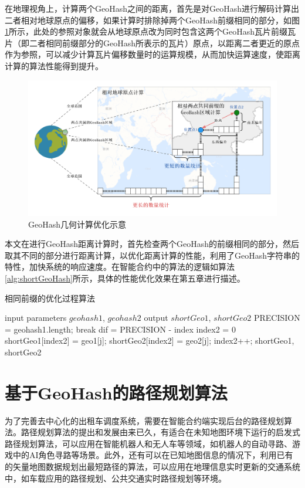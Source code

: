 在地理视角上，计算两个GeoHash之间的距离，首先是对GeoHash进行解码计算出二者相对地球原点的偏移，如果计算时排除掉两个GeoHash前缀相同的部分，如图\ref{fig:calBetter}所示，此处的参照对象就会从地球原点改为同时包含这两个GeoHash瓦片前缀瓦片（即二者相同前缀部分的GeoHash所表示的瓦片）原点，以距离二者更近的原点作为参照，可以减少计算瓦片偏移数量时的运算规模，从而加快运算速度，使距离计算的算法性能得到提升。

\begin{figure}[h]
  \centering
  \includegraphics[width=1.0\textwidth]{figures/GeoHash计算优化}
  \caption{GeoHash几何计算优化示意}\label{fig:calBetter}
\end{figure}

本文在进行GeoHash距离计算时，首先检查两个GeoHash的前缀相同的部分，然后取其不同的部分进行距离计算，以优化距离计算的性能，利用了GeoHash字符串的特性，加快系统的响应速度。在智能合约中的算法的逻辑如算法\ref{alg:shortGeoHash}所示，具体的性能优化效果在第五章进行描述。

\begin{algorithm}[h]
  \caption{相同前缀的优化过程算法}
  \label{alg:shortGeoHash}
  \begin{algorithmic}[1]
  \REQUIRE input parameters $geohash1$, $geohash2$
  \ENSURE output $shortGeo1$, $shortGeo2$
  \STATE PRECISION = geohash1.length;
      \STATE break
    \ENDIF
  \ENDFOR
  \STATE dif = PRECISION - index
  \STATE index2 = 0
    \STATE shortGeo1[index2] = geo1[j];
    \STATE shortGeo2[index2] = geo2[j];
    \STATE index2++;
  \ENDFOR
  \RETURN shortGeo1, shortGeo2
  \end{algorithmic}
\end{algorithm}

\section{基于GeoHash的路径规划算法}
为了完善去中心化的出租车调度系统，需要在智能合约端实现后台的路径规划算法。路径规划算法的提出和发展由来已久，有适合在未知地图环境下运行的启发式路径规划算法，可以应用在智能机器人和无人车等领域，如机器人的自动寻路、游戏中的AI角色寻路等场景。此外，还有可以在已知地图信息的情况下，利用已有的矢量地图数据规划出最短路径的算法，可以应用在地理信息实时更新的交通系统中，如车载应用的路径规划、公共交通实时路径规划等环境。

